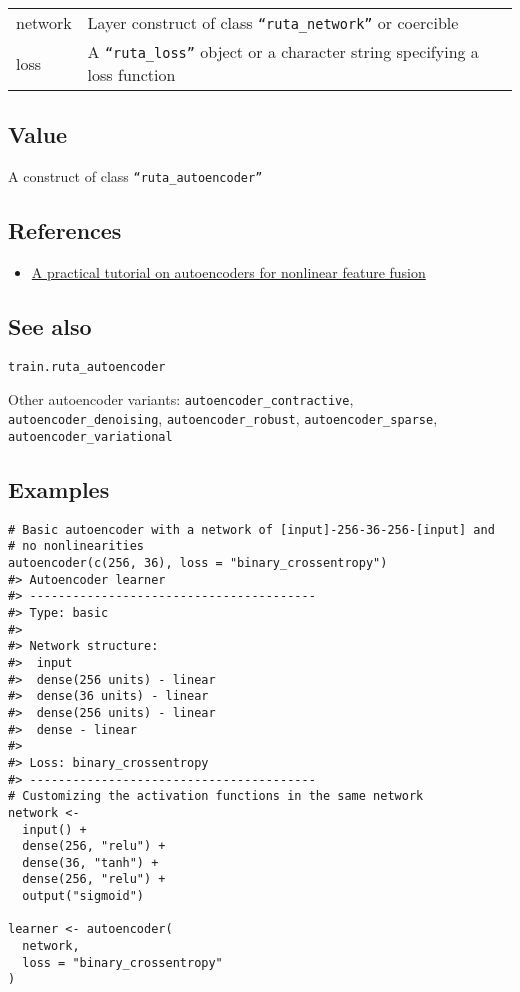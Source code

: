 \begin{longtable}[c]{@{}>{\small}p{3cm}>{\raggedright}p{12.5cm}@{}}
\toprule
network & Layer construct of class \texttt{``ruta\_network''} or
coercible\tabularnewline
loss & A \texttt{``ruta\_loss''} object or a character string specifying a
loss function\tabularnewline
\bottomrule
\end{longtable}

\hypertarget{value}{\subsection{\texorpdfstring{\protect\hyperlink{value}{}Value}{Value}}\label{value}}

A construct of class \texttt{``ruta\_autoencoder''}

\hypertarget{references}{\subsection{\texorpdfstring{\protect\hyperlink{references}{}References}{References}}\label{references}}

\begin{itemize}
\tightlist
\item
  \href{https://arxiv.org/abs/1801.01586}{A practical tutorial on
  autoencoders for nonlinear feature fusion}
\end{itemize}

\hypertarget{see-also}{\subsection{\texorpdfstring{\protect\hyperlink{see-also}{}See
also}{See also}}\label{see-also}}

\texttt{train.ruta\_autoencoder}

Other autoencoder variants: \texttt{autoencoder\_contractive},
\texttt{autoencoder\_denoising}, \texttt{autoencoder\_robust},
\texttt{autoencoder\_sparse}, \texttt{autoencoder\_variational}

\hypertarget{examples}{\subsection{\texorpdfstring{\protect\hyperlink{examples}{}Examples}{Examples}}\label{examples}}

\begin{verbatim}
# Basic autoencoder with a network of [input]-256-36-256-[input] and
# no nonlinearities
autoencoder(c(256, 36), loss = "binary_crossentropy")
#> Autoencoder learner
#> ----------------------------------------
#> Type: basic 
#> 
#> Network structure:
#>  input
#>  dense(256 units) - linear
#>  dense(36 units) - linear
#>  dense(256 units) - linear
#>  dense - linear
#> 
#> Loss: binary_crossentropy 
#> ----------------------------------------
# Customizing the activation functions in the same network
network <-
  input() +
  dense(256, "relu") +
  dense(36, "tanh") +
  dense(256, "relu") +
  output("sigmoid")

learner <- autoencoder(
  network,
  loss = "binary_crossentropy"
)
\end{verbatim}


